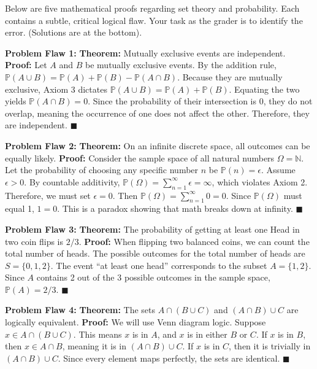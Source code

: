 \documentclass[11pt]{article}
\newcommand{\prob}[1]{\vspace{4mm}\noindent\textbf{Problem #1:}}
\newcommand{\qedsymbolcustom}{$\blacksquare$}
\begin{document}
Below are five mathematical proofs regarding set theory and probability. Each contains a subtle, critical logical flaw. Your task as the grader is to identify the error. (Solutions are at the bottom).

\prob{Flaw 1} \textbf{Theorem:} Mutually exclusive events are independent.
\newline \textbf{Proof:} Let $A$ and $B$ be mutually exclusive events. By the addition rule, $\mathbb{P}(A \cup B) = \mathbb{P}(A) + \mathbb{P}(B) - \mathbb{P}(A \cap B)$. Because they are mutually exclusive, Axiom 3 dictates $\mathbb{P}(A \cup B) = \mathbb{P}(A) + \mathbb{P}(B)$. Equating the two yields $\mathbb{P}(A \cap B) = 0$. Since the probability of their intersection is 0, they do not overlap, meaning the occurrence of one does not affect the other. Therefore, they are independent. \qedsymbolcustom

\prob{Flaw 2} \textbf{Theorem:} On an infinite discrete space, all outcomes can be equally likely.
\newline \textbf{Proof:} Consider the sample space of all natural numbers $\Omega = \mathbb{N}$. Let the probability of choosing any specific number $n$ be $\mathbb{P}(n) = \epsilon$. Assume $\epsilon > 0$. By countable additivity, $\mathbb{P}(\Omega) = \sum_{n=1}^\infty \epsilon = \infty$, which violates Axiom 2. Therefore, we must set $\epsilon = 0$. Then $\mathbb{P}(\Omega) = \sum_{n=1}^\infty 0 = 0$. Since $\mathbb{P}(\Omega)$ must equal 1, $1=0$. This is a paradox showing that math breaks down at infinity. \qedsymbolcustom

\prob{Flaw 3} \textbf{Theorem:} The probability of getting at least one Head in two coin flips is $2/3$.
\newline \textbf{Proof:} When flipping two balanced coins, we can count the total number of heads. The possible outcomes for the total number of heads are $S = \{0, 1, 2\}$. The event ``at least one head'' corresponds to the subset $A = \{1, 2\}$. Since $A$ contains 2 out of the 3 possible outcomes in the sample space, $\mathbb{P}(A) = 2/3$. \qedsymbolcustom

\prob{Flaw 4} \textbf{Theorem:} The sets $A \cap (B \cup C)$ and $(A \cap B) \cup C$ are logically equivalent.
\newline \textbf{Proof:} We will use Venn diagram logic. Suppose $x \in A \cap (B \cup C)$. This means $x$ is in $A$, and $x$ is in either $B$ or $C$. If $x$ is in $B$, then $x \in A \cap B$, meaning it is in $(A \cap B) \cup C$. If $x$ is in $C$, then it is trivially in $(A \cap B) \cup C$. Since every element maps perfectly, the sets are identical. \qedsymbolcustom
\end{document}
